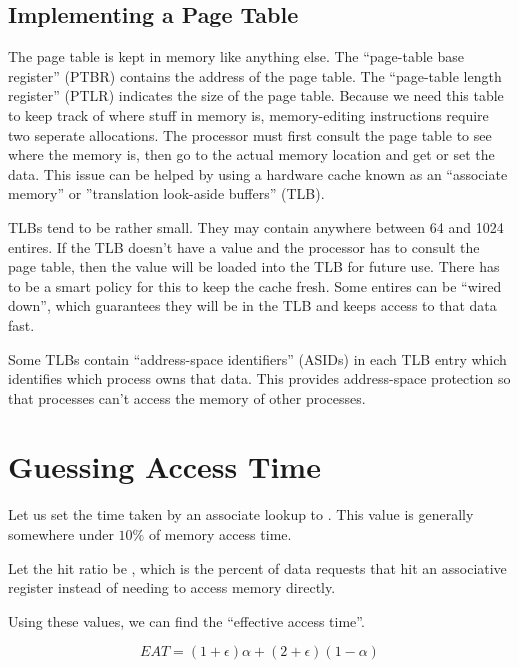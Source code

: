\documentclass{article}
\begin{document}
\subsection{Implementing a Page Table}
The page table is kept in memory like anything else. The ``page-table base
register'' (PTBR) contains the address of the page table. The ``page-table
length register'' (PTLR) indicates the size of the page table. Because we
need this table to keep track of where stuff in memory is, memory-editing
instructions require two seperate allocations. The processor must first
consult the page table to see where the memory is, then go to the actual memory
location and get or set the data. This issue can be helped by using a hardware
cache known as an ``associate memory'' or ''translation look-aside buffers''
(TLB).

TLBs tend to be rather small. They may contain anywhere between 64 and 1024
entires. If the TLB doesn't have a value and the processor has to consult the
page table, then the value will be loaded into the TLB for future use. There
has to be a smart policy for this to keep the cache fresh. Some entires can be
``wired down'', which guarantees they will be in the TLB and keeps access to
that data fast.

Some TLBs contain ``address-space identifiers'' (ASIDs) in each TLB entry which
identifies which process owns that data. This provides address-space protection
so that processes can't access the memory of other processes.

\section{Guessing Access Time}
Let us set the time taken by an associate lookup to \epsilon. This value is
generally somewhere under $10\%$ of memory access time.

Let the hit ratio be \alpha, which is the percent of data requests that hit
an associative register instead of needing to access memory directly.

Using these values, we can find the ``effective access time''.

$$EAT = (1+\epsilon)\alpha + (2+\epsilon)(1-\alpha)$$
\end{document}

